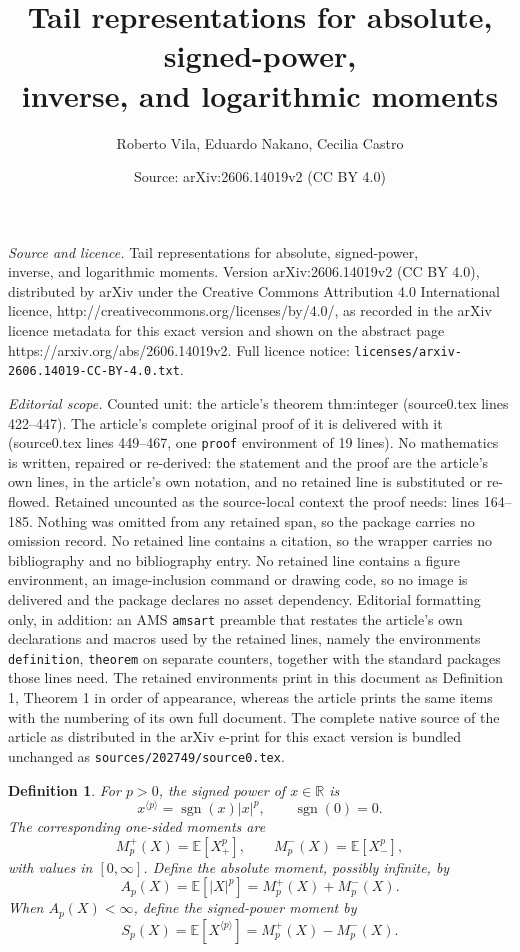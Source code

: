 \documentclass[10pt,a4paper]{amsart}
\title{Tail representations for absolute, signed-power,\\ inverse, and logarithmic moments}
\author{Roberto Vila, Eduardo Nakano, Cecilia Castro}
\date{Source: arXiv:2606.14019v2 (CC BY 4.0)}
\newtheorem{definition}{Definition}
\newcommand{\E}{\mathbb{E}}
\newcommand{\R}{\mathbb{R}}
\newcommand{\abs}[1]{\left\lvert #1\right\rvert}
\newcommand{\sgn}{\operatorname{sgn}}
\newcommand{\spow}[2]{#1^{\langle #2\rangle}}
\begin{document}
\maketitle

\noindent\emph{Source and licence.} Tail representations for absolute, signed-power,\\ inverse, and logarithmic moments. Version arXiv:2606.14019v2 (CC BY 4.0), distributed by arXiv under the Creative Commons Attribution 4.0 International licence, http://creativecommons.org/licenses/by/4.0/, as recorded in the arXiv licence metadata for this exact version and shown on the abstract page https://arxiv.org/abs/2606.14019v2. Full licence notice: \texttt{licenses/arxiv-2606.14019-CC-BY-4.0.txt}.\par\smallskip

\noindent\textit{Editorial scope.} Counted unit: the article's theorem thm:integer (source0.tex lines 422--447). The article's complete original proof of it is delivered with it (source0.tex lines 449--467, one \texttt{proof} environment of 19 lines). No mathematics is written, repaired or re-derived: the statement and the proof are the article's own lines, in the article's own notation, and no retained line is substituted or re-flowed.  Retained uncounted as the source-local context the proof needs: lines 164--185.  Nothing was omitted from any retained span, so the package carries no omission record.  No retained line contains a citation, so the wrapper carries no bibliography and no bibliography entry.  No retained line contains a figure environment, an image-inclusion command or drawing code, so no image is delivered and the package declares no asset dependency.  Editorial formatting only, in addition: an AMS \texttt{amsart} preamble that restates the article's own declarations and macros used by the retained lines, namely the environments \texttt{definition}, \texttt{theorem} on separate counters, together with the standard packages those lines need.  The retained environments print in this document as Definition 1, Theorem 1 in order of appearance, whereas the article prints the same items with the numbering of its own full document.  The complete native source of the article as distributed in the arXiv e-print for this exact version is bundled unchanged as \texttt{sources/202749/source0.tex}.
\begin{definition}\label{def:signed-power}
For $p>0$, the \emph{signed power} of $x\in\R$ is
\[
  \spow{x}{p}=\sgn(x)\abs{x}^p,
  \qquad \sgn(0)=0.
\]
The corresponding one-sided moments are
\[
  M_p^+(X)=\E[X_+^p],
  \qquad
  M_p^-(X)=\E[X_-^p],
\]
with values in $[0,\infty]$.  Define the absolute moment, possibly infinite,
by
\[
  A_p(X)=\E[\abs{X}^p]=M_p^+(X)+M_p^-(X).
\]
When $A_p(X)<\infty$, define the signed-power moment by
\[
  S_p(X)=\E[\spow{X}{p}]=M_p^+(X)-M_p^-(X).
\]
\end{definition}
\end{document}
